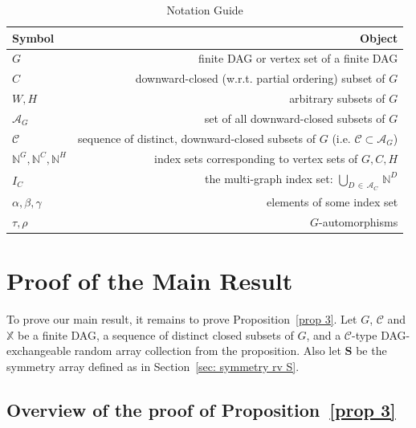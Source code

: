 \documentclass[AHL,Unicode,longabstracts,published]{cedram}
\newcommand*\X{\mathbb{X}}
\newcommand*\N{\mathbb{N}}
\renewcommand{\AA}{\mathcal{A}}
\newcommand*\CC{{\mathcal{C}}}
\newcommand*\bS{\mathbf{S}}
\newcommand*\N{\mathbb{N}}
\begin{document}
\begin{table}[t]
\begin{center}
\caption{Notation Guide}\label{tab:table1}
\begin{tabular}{l|r}
Symbol & Object \\
\hline $G$& finite DAG or vertex set of a finite DAG \\
$C$& downward-closed (w.r.t. partial ordering) subset of $G$ \\
$W, H$& arbitrary subsets of $G$ \\
$\AA_G$& set of all downward-closed subsets of $G$\\
$\CC$& sequence of {distinct}, downward-closed subsets of $G$ (i.e. $\CC\subset\AA_G$)\\
$\N^G, \N^C, \N^H$ & index sets corresponding to vertex sets of $G,C,H$\\
$I_C$& the multi-graph index set: $\bigcup_{D\,\in\, \AA_C}\,\N^D$\\
$\alpha, \beta, \gamma$ & elements of some index set \\
$\tau, \rho$ & $G$-automorphisms \\
\end{tabular}
\end{center}
\end{table}


\section{Proof of the Main Result}\label{sec:proof}
To prove our main result, it remains to prove Proposition~\ref{prop 3}. Let $G$, $\CC$ and $\X$ be a finite DAG, a sequence of distinct closed subsets of $G$, and a $\CC$-type DAG-exchangeable random array collection from the proposition. Also let $\bS$ be {the symmetry array} defined as in Section~\ref{sec: symmetry rv S}.




\subsection*{Overview of the proof of Proposition~\ref{prop 3}}
\end{document}
